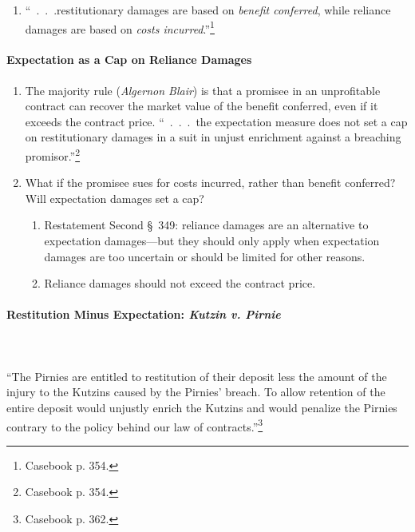 \begin{enumerate}
    \item ``~.~.~.restitutionary damages are based on \emph{benefit 
    conferred}, while reliance damages are based on \emph{costs 
    incurred}.''\footnote{Casebook p. 354.}
\end{enumerate}

\paragraph{Expectation as a Cap on Reliance Damages}

\begin{enumerate}
    \item The majority rule (\emph{Algernon Blair}) is that a promisee in an 
    unprofitable contract can recover the market value of the benefit 
    conferred, even if it exceeds the contract price. ``~.~.~.~the expectation 
    measure does not set a cap on restitutionary damages in a suit in unjust 
    enrichment against a breaching promisor.''\footnote{Casebook p. 354.}
    \item What if the promisee sues for costs incurred, rather than benefit 
    conferred? Will expectation damages set a cap?
    \begin{enumerate}
        \item Restatement Second \S\ 349: reliance damages are an alternative 
        to expectation damages---but they should only apply when expectation 
        damages are too uncertain or should be limited for other reasons.
        \item Reliance damages should not exceed the contract price.
    \end{enumerate}
\end{enumerate}

\paragraph{Restitution Minus Expectation: \emph{Kutzin v. Pirnie}}
~\\\\
``The Pirnies are entitled to restitution of their deposit less the amount of 
the injury to the Kutzins caused by the Pirnies' breach. To allow retention of 
the entire deposit would unjustly enrich the Kutzins and would penalize the 
Pirnies contrary to the policy behind our law of 
contracts.''\footnote{Casebook p. 362.}

